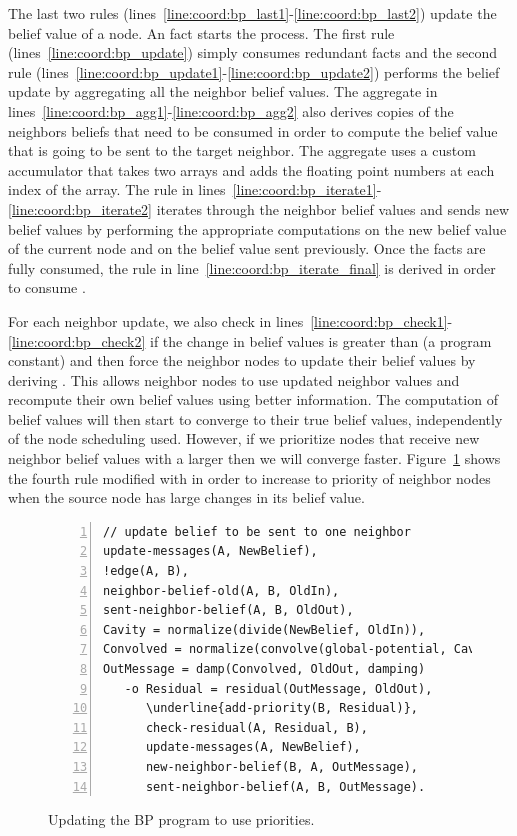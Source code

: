 The last two rules (lines~\ref{line:coord:bp_last1}-\ref{line:coord:bp_last2})
update the belief value of a node. An  fact starts the process.
The first rule (lines~\ref{line:coord:bp_update}) simply consumes redundant
 facts and the second rule
(lines~\ref{line:coord:bp_update1}-\ref{line:coord:bp_update2}) performs the
belief update by aggregating all the neighbor belief values. The aggregate in
lines~\ref{line:coord:bp_agg1}-\ref{line:coord:bp_agg2} also derives copies of
the neighbors beliefs that need to be consumed in order to compute the belief
value that is going to be sent to the target neighbor. The aggregate uses a
custom accumulator that takes two arrays and adds the floating point numbers at
each index of the array. The rule in
lines~\ref{line:coord:bp_iterate1}-\ref{line:coord:bp_iterate2} iterates through
the neighbor belief values and sends new belief values by performing the
appropriate computations on the new belief value of the current node and on the
belief value sent previously.  Once the facts  are
fully consumed, the rule in line~\ref{line:coord:bp_iterate_final} is derived in
order to consume .

For each neighbor update, we also check in
lines~\ref{line:coord:bp_check1}-\ref{line:coord:bp_check2} if the change in
belief values is greater than  (a program constant) and then force
the neighbor nodes to update their belief values by deriving .
This allows neighbor nodes to use updated neighbor values and recompute their
own belief values using better information. The computation of belief values
will then start to converge to their true belief values, independently of the
node scheduling used. However, if we prioritize nodes that receive new neighbor
belief values with a larger  then we will converge faster.
Figure~\ref{code:coordination:improved_bp} shows the fourth rule modified with
 in order to increase to priority of neighbor nodes when the
source node has large changes in its belief value.

\begin{figure}[h!]
\begin{Verbatim}[numbers=left,commandchars=\\\{\},fontsize=\codesize]
// update belief to be sent to one neighbor
update-messages(A, NewBelief),
!edge(A, B),
neighbor-belief-old(A, B, OldIn),
sent-neighbor-belief(A, B, OldOut),
Cavity = normalize(divide(NewBelief, OldIn)),
Convolved = normalize(convolve(global-potential, Cavity)),
OutMessage = damp(Convolved, OldOut, damping)
   -o Residual = residual(OutMessage, OldOut),
      \underline{add-priority(B, Residual)},
      check-residual(A, Residual, B),
      update-messages(A, NewBelief),
      new-neighbor-belief(B, A, OutMessage),
      sent-neighbor-belief(A, B, OutMessage).
\end{Verbatim}
\caption{Updating the BP program to use priorities.}
\label{code:coordination:improved_bp}
\end{figure}


